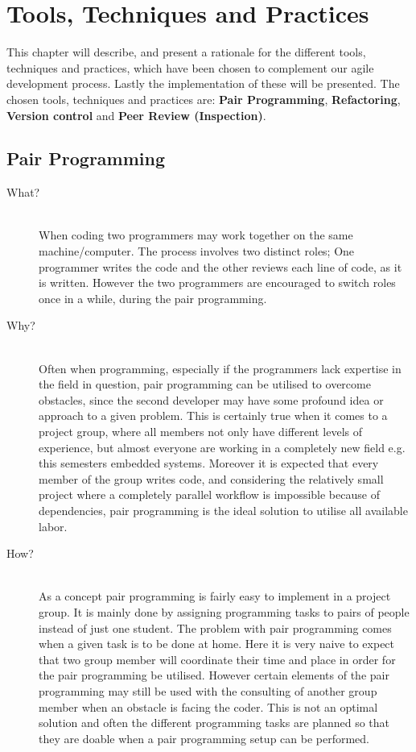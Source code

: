 
\chapter{Tools, Techniques and Practices} %
\label{cha:tools_techniques_and_practices}
This chapter will describe, and present a rationale for the different tools, techniques and practices, which have been chosen to complement our agile development process.
Lastly the implementation of these will be presented.
The chosen tools, techniques and practices are: \textbf{Pair Programming}, \textbf{Refactoring}, \textbf{Version control} and \textbf{Peer Review (Inspection)}.

\section{Pair Programming} %
\label{sec:pair_programming}
\begin{description}
    \item[What?]\hfill\\
    When coding two programmers may work together on the same machine/computer.
The process involves two distinct roles; One programmer writes the code and the other reviews each line of code, as it is written. 
However the two programmers are encouraged to switch roles once in a while, during the pair programming.
    
    \item[Why?]\hfill\\ 
    Often when programming, especially if the programmers lack expertise in the field in question, pair programming can be utilised to overcome obstacles, since the second developer may have some profound idea or approach to a given problem.
    This is certainly true when it comes to a project group, where all members not only have different levels of experience, but almost everyone are working in a completely new field e.g. this semesters embedded systems.
    Moreover it is expected that every member of the group writes code, and considering the relatively small project where a completely parallel workflow is impossible because of dependencies, pair programming is the ideal solution to utilise all available labor.
    
    \item[How?]\hfill\\
    As a concept pair programming is fairly easy to implement in a project group.
    It is mainly done by assigning programming tasks to pairs of people instead of just one student.
    The problem with pair programming comes when a given task is to be done at home.
    Here it is very naive to expect that two group member will coordinate their time and place in order for the pair programming be utilised.
    However certain elements of the pair programming may still be used with the consulting of another group member when an obstacle is facing the coder.
    This is not an optimal solution and often the different programming tasks are planned so that they are doable when a pair programming setup can be performed.
\end{description}
